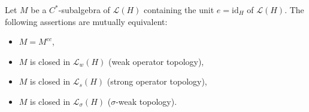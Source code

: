 Let $M$ be a $C^*$-subalgebra of $\mathcal{L}(H)$ containing the unit $e = \mathrm{id}_H$ of $\mathcal{L}(H)$. The following assertions are mutually equivalent:
\begin{itemize}
\item[(a)] $M = M^{cc}$,
\item[(b)] $M$ is closed in $\mathcal{L}_w(H)$ (weak operator topology),
\item[(c)] $M$ is closed in $\mathcal{L}_s(H)$ (strong operator topology),
\item[(d)] $M$ is closed in $\mathcal{L}_\sigma(H)$ ($\sigma$-weak topology).
\end{itemize}
